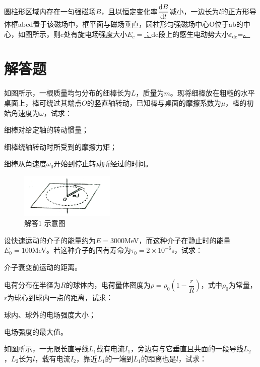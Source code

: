 圆柱形区域内存在一匀强磁场$B$，且以恒定变化率$\dfrac{\mathrm{d}B}{\mathrm{d}t}$减小，一边长为$l$的正方形导体框abcd置于该磁场中，框平面与磁场垂直，圆柱形匀强磁场中心O位于ab的中心，如图所示，则c处有旋电场强度大小$E_c=$\ul ；dc段上的感生电动势大小$\varepsilon_{\textrm{dc}}$=\ul。


\section{解答题}%
如图所示，一根质量均匀分布的细棒长为$L$，质量为$m$。现将细棒放在粗糙的水平桌面上，棒可绕过其端点$O$的竖直轴转动，已知棒与桌面的摩擦系数为$\mu$，棒的初始角速度为$\omega$，试求：%

细棒对给定轴的转动惯量；

细棒绕轴转动时所受到的摩擦力矩；

细棒从角速度$\omega_0$开始到停止转动所经过的时间。
\begin{figure}[!h]
	\begin{flushright}
		\includegraphics[width=0.4\textwidth]{./illus/2012_10.png}
		\caption{解答1 示意图}
	\end{flushright}
\end{figure}

设快速运动的介子的能量约为$E=3000$MeV，而这种介子在静止时的能量$E_0=100$MeV。若这种介子的固有寿命为$\tau_0=2\times 10^{-6}$s，试求：

介子衰变前运动的距离。

\vspace{10em}
电荷分布在半径为$R$的球体内，电荷量体密度为$\rho=\rho_0(1-\dfrac{r}{R})$，式中$\rho_0$为常量，$r$为球心到球内一点的距离，试求：

球内、球外的电场强度大小；

电场强度的最大值。

\vspace{10em}
如图所示，一无限长直导线$L_1$载有电流$I_1$，旁边有与它垂直且共面的一段导线$L_2$，$L_2$长为$l$，载有电流$I_2$，靠近$L_1$的一端到$L_1$的距离也是$l$，试求：

